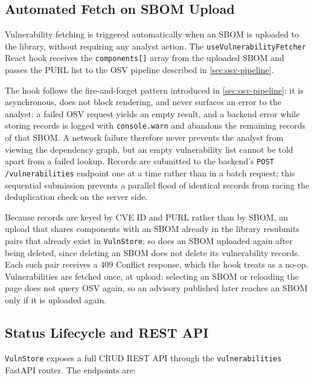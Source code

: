 \subsection{Automated Fetch on SBOM Upload}
\label{sec:automated-fetch}

Vulnerability fetching is triggered automatically when an SBOM is uploaded to the library, without requiring any analyst action. The \texttt{useVulnerabilityFetcher} React hook receives the \texttt{components[]} array from the uploaded SBOM and passes the PURL list to the OSV pipeline described in \autoref{sec:osv-pipeline}.

The hook follows the fire-and-forget pattern introduced in \autoref{sec:osv-pipeline}: it is asynchronous, does not block rendering, and never surfaces an error to the analyst: a failed OSV request yields an empty result, and a backend error while storing records is logged with \texttt{console.warn} and abandons the remaining records of that SBOM. A network failure therefore never prevents the analyst from viewing the dependency graph, but an empty vulnerability list cannot be told apart from a failed lookup. Records are submitted to the backend's \texttt{POST /vulnerabilities} endpoint one at a time rather than in a batch request; this sequential submission prevents a parallel flood of identical records from racing the deduplication check on the server side.

Because records are keyed by CVE ID and PURL rather than by SBOM, an upload that shares components with an SBOM already in the library resubmits pairs that already exist in \texttt{VulnStore}; so does an SBOM uploaded again after being deleted, since deleting an SBOM does not delete its vulnerability records. Each such pair receives a 409 Conflict response, which the hook treats as a no-op. Vulnerabilities are fetched once, at upload: selecting an SBOM or reloading the page does not query OSV again, so an advisory published later reaches an SBOM only if it is uploaded again.


\subsection{Status Lifecycle and REST API}
\label{sec:status-lifecycle}

\texttt{VulnStore} exposes a full CRUD REST API through the \texttt{vulnerabilities} FastAPI router. The endpoints are:

